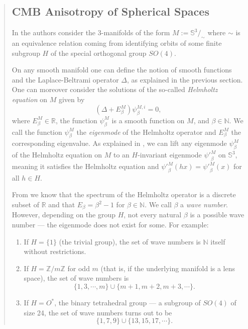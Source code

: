 \documentclass{article}
\theoremstyle{definition}
\begin{document}
\begin{abstract}
\subsection{CMB Anisotropy of Spherical Spaces}




In \cite{aurich_2005} the authors consider the 3-manifolds of the form $M := \mathbb{S}^3 /_ \sim$ where $\sim$ is an equivalence relation coming from identifying orbits of some finite subgroup $H$ of the special orthogonal group $SO(4)$.

On any smooth manifold one can define the notion of smooth functions and the Laplace-Beltrami operator $\Delta$, as explained in the previous section. One can moreover consider the solutions of the so-called \textit{Helmholtz equation} on $M$ given by
$$(\Delta + E_\beta^M)\psi_\beta^{M, i} = 0,$$
where $E_\beta^M \in \mathbb{R}$, the function $\psi_\beta^{M}$ is a smooth function on $M$, and $\beta \in \mathbb{N}.$ We call the function $\psi_\beta^M$ the \textit{eigenmode} of the Helmholtz operator and $E_\beta^M$ the corresponding eigenvalue.
As explained in \cite{luminet_2005}, we can lift any eigenmode $\psi _\beta^M$ of the Helmholtz equation on $M$ to an $H$-invariant eigenmode
${\psi'}_\beta^M$ on $\mathbb{S}^3$, meaning it satisfies the Helmholtz equation
and ${\psi'}_\beta^M(hx) = {\psi'}_\beta^M(x)$ for all $h \in H$.


From \cite{aurich_2005} we know that the spectrum of the Helmholtz operator is a discrete subset of $\mathbb{R}$ and that $E_\beta = \beta^2 - 1$ for $\beta \in \mathbb{N}$. We call $\beta$ a \emph{wave number}. However, depending on the group $H$, not every natural $\beta$ is a possible wave number --- the eigenmode does not exist for some. For example:
\begin{enumerate}
    \item If $H = \{1\}$ (the trivial group), the set of wave numbers is $\mathbb{N}$ itself without restrictions.
    \item If $H = \mathbb Z/m\mathbb Z$ for odd $m$ (that is, if the underlying manifold is a lens space), the set of wave numbers is $$\{1,3,\cdots, m\}\cup \{m+1, m+2, m+3, \cdots \}.$$
    \item  If $H = O^*$, the binary tetrahedral group --- a subgroup of $SO(4)$ of size 24, the set of wave numbers turns out to be $$\{ 1,7,9 \} \cup \{13,15,17,\cdots \}.$$
\end{enumerate}




\end{abstract}
\end{document}
